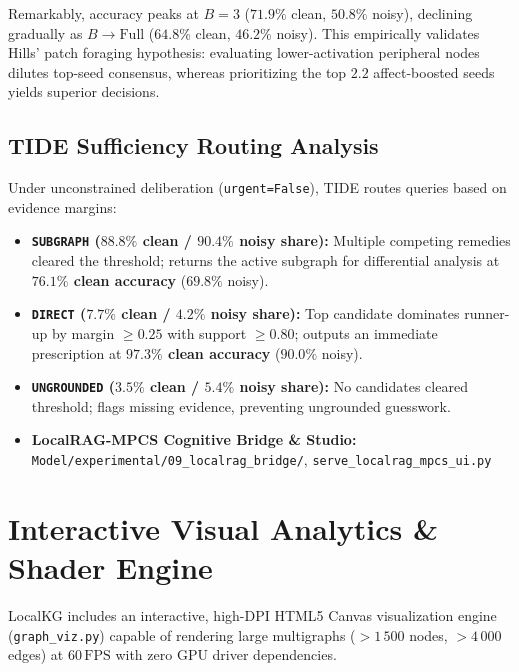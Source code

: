 \documentclass[10pt,twocolumn,letterpaper]{article}
\begin{document}
Remarkably, accuracy peaks at $B=3$ ($71.9\%$ clean, $50.8\%$ noisy), declining gradually as $B \rightarrow \text{Full}$ ($64.8\%$ clean, $46.2\%$ noisy). This empirically validates Hills' patch foraging hypothesis: evaluating lower-activation peripheral nodes dilutes top-seed consensus, whereas prioritizing the top $2.2$ affect-boosted seeds yields superior decisions.

\subsection{TIDE Sufficiency Routing Analysis}
Under unconstrained deliberation (\texttt{urgent=False}), TIDE routes queries based on evidence margins:
\begin{itemize}
  \item \textbf{\texttt{SUBGRAPH} ($88.8\%$ clean / $90.4\%$ noisy share):} Multiple competing remedies cleared the threshold; returns the active subgraph for differential analysis at \textbf{$76.1\%$ clean accuracy} ($69.8\%$ noisy).
  \item \textbf{\texttt{DIRECT} ($7.7\%$ clean / $4.2\%$ noisy share):} Top candidate dominates runner-up by margin $\ge 0.25$ with support $\ge 0.80$; outputs an immediate prescription at \textbf{$97.3\%$ clean accuracy} ($90.0\%$ noisy).
  \item \textbf{\texttt{UNGROUNDED} ($3.5\%$ clean / $5.4\%$ noisy share):} No candidates cleared threshold; flags missing evidence, preventing ungrounded guesswork.
  \item \textbf{LocalRAG-MPCS Cognitive Bridge \& Studio:} \nolinkurl{Model/experimental/09_localrag_bridge/}, \nolinkurl{serve_localrag_mpcs_ui.py}
\end{itemize}

\section{Interactive Visual Analytics \& Shader Engine}
LocalKG includes an interactive, high-DPI HTML5 Canvas visualization engine (\texttt{graph\_viz.py}) capable of rendering large multigraphs ($>1\,500$ nodes, $>4\,000$ edges) at $60\,\text{FPS}$ with zero GPU driver dependencies.
\end{document}
